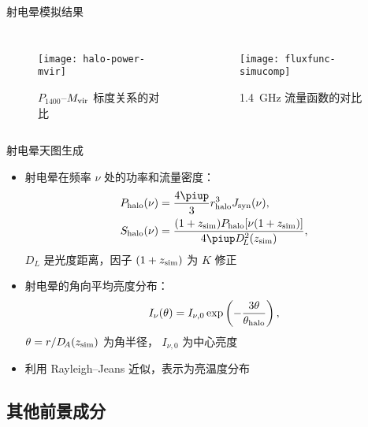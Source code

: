 \documentclass{beamer}
\begin{document}
\begin{frame}{射电晕模拟结果}
  \begin{columns}
    \begin{figure}
      \centering
      \texttt{[image: halo-power-mvir]}
      \caption{$P_{1400}$--$M_{\text{vir}}$ 标度关系的对比}
    \end{figure}

    \begin{figure}
      \centering
      \texttt{[image: fluxfunc-simucomp]}
      \caption{\SI{1.4}{\GHz} 流量函数的对比}
    \end{figure}
  \end{columns}
\end{frame}

\begin{frame}{射电晕天图生成}
  \begin{itemize}
    \item 射电晕在频率 $\nu$ 处的功率和流量密度：
      \begin{align}
        P_{\R{halo}}(\nu)
          & = \frac{4\Cpi}{3} r^3_{\R{halo}} J_{\R{syn}}(\nu) , \\
        S_{\R{halo}}(\nu)
          & = \frac{(1+z_{\R{sim}}) P_{\R{halo}}[\nu (1+z_{\R{sim}})]}{
            4\Cpi D^2_{\!L}(z_{\R{sim}})} ,
      \end{align}
      $D_{\!L}$ 是光度距离，因子 $(1+z_{\text{sim}})$ 为 $K$ 修正
    \item 射电晕的角向平均亮度分布：
      \begin{equation}
        I_{\nu}(\theta) = I_{\nu,0} \exp
          \left( -\frac{3\theta}{\theta_{\text{halo}}} \right) ,
      \end{equation}
      $\theta = r / D_{\!A}(z_{\text{sim}})$ 为角半径，
      $I_{\nu,0}$ 为中心亮度
    \item 利用 Rayleigh--Jeans 近似，表示为亮温度分布
  \end{itemize}
\end{frame}

\subsection{其他前景成分}
\end{document}

